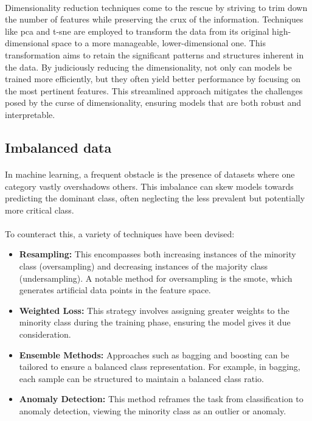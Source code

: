             \paragraph{}Dimensionality reduction techniques come to the rescue by striving to trim down the number of features while preserving the crux of the information. Techniques like \acrfull{pca} and \acrfull{t-sne} are employed to transform the data from its original high-dimensional space to a more manageable, lower-dimensional one. This transformation aims to retain the significant patterns and structures inherent in the data. By judiciously reducing the dimensionality, not only can models be trained more efficiently, but they often yield better performance by focusing on the most pertinent features. This streamlined approach mitigates the challenges posed by the curse of dimensionality, ensuring models that are both robust and interpretable.

    \subsection{Imbalanced data}\label{seq:background:imbalanced_data}
        \paragraph{}In machine learning, a frequent obstacle is the presence of datasets where one category vastly overshadows others\cite{ramyachitra_imbalanced_2014}. This imbalance can skew models towards predicting the dominant class, often neglecting the less prevalent but potentially more critical class.

        \paragraph{}To counteract this, a variety of techniques have been devised:
        \begin{itemize}
            \item \textbf{Resampling:} This encompasses both increasing instances of the minority class (oversampling) and decreasing instances of the majority class (undersampling). A notable method for oversampling is the \acrfull{smote}, which generates artificial data points in the feature space.
            \item \textbf{Weighted Loss:} This strategy involves assigning greater weights to the minority class during the training phase, ensuring the model gives it due consideration.
            \item \textbf{Ensemble Methods:} Approaches such as bagging and boosting can be tailored to ensure a balanced class representation. For example, in bagging, each sample can be structured to maintain a balanced class ratio.
            \item \textbf{Anomaly Detection:} This method reframes the task from classification to anomaly detection, viewing the minority class as an outlier or anomaly.
        \end{itemize}
